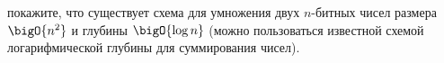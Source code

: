 покажите, что существует схема для умножения двух $n$-битных чисел размера $\bigO{n^2}$ и глубины
$\bigO{\log n}$ (можно пользоваться известной схемой логарифмической глубины для суммирования чисел).
